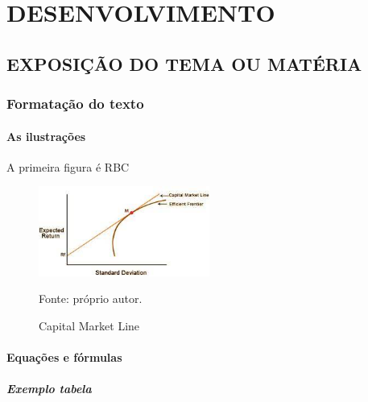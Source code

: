 \section{DESENVOLVIMENTO}
    \subsection{EXPOSIÇÃO DO TEMA OU MATÉRIA}
    \subsubsection{Formatação do texto}
    \paragraph{As ilustrações}

        \noindent A primeira figura é \acrfull{RBC}

        \begin{figure}[htp]
            \centering
            \caption{Capital Market Line}
            \includegraphics[width=0.5\textwidth]{./imagens/cml.jpg}
            \par \footnotesize Fonte: próprio autor.
            \label{fig:cml}
        \end{figure}


    \paragraph{Equações e fórmulas}
    
    \subparagraph{Exemplo tabela}
        
